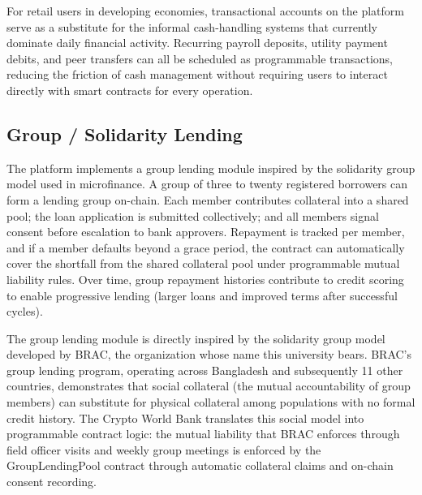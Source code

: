 \documentclass[12pt,a4paper]{report}
\begin{document}
For retail users in developing economies, transactional accounts on the platform serve as a substitute for the informal cash-handling systems that currently dominate daily financial activity. Recurring payroll deposits, utility payment debits, and peer transfers can all be scheduled as programmable transactions, reducing the friction of cash management without requiring users to interact directly with smart contracts for every operation.

\subsection{Group / Solidarity Lending}

The platform implements a group lending module inspired by the solidarity group model used in microfinance. A group of three to twenty registered borrowers can form a lending group on-chain. Each member contributes collateral into a shared pool; the loan application is submitted collectively; and all members signal consent before escalation to bank approvers. Repayment is tracked per member, and if a member defaults beyond a grace period, the contract can automatically cover the shortfall from the shared collateral pool under programmable mutual liability rules. Over time, group repayment histories contribute to credit scoring to enable progressive lending (larger loans and improved terms after successful cycles).

The group lending module is directly inspired by the solidarity group model developed by BRAC, the organization whose name this university bears. BRAC's group lending program, operating across Bangladesh and subsequently 11 other countries, demonstrates that social collateral (the mutual accountability of group members) can substitute for physical collateral among populations with no formal credit history. The Crypto World Bank translates this social model into programmable contract logic: the mutual liability that BRAC enforces through field officer visits and weekly group meetings is enforced by the GroupLendingPool contract through automatic collateral claims and on-chain consent recording.
\end{document}
